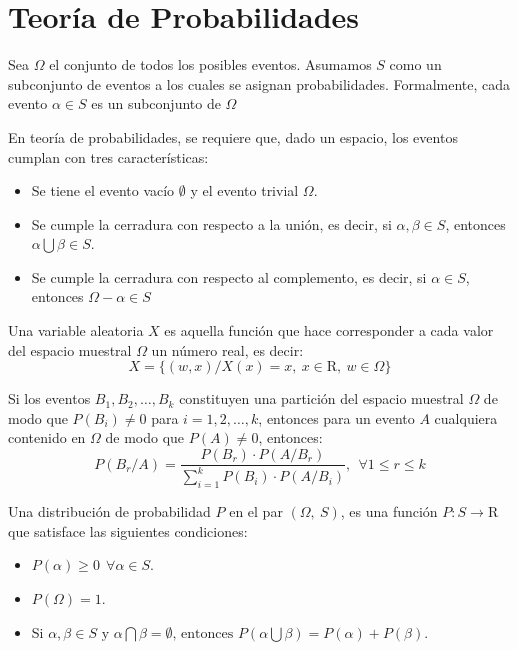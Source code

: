 \section{Teoría de Probabilidades}
\label{sec:teoria-probabilidades}
  \begin{defn} Sea $\Omega$ el conjunto de todos los 
  posibles eventos. Asumamos $S$ como un subconjunto de eventos a los cuales 
  se asignan probabilidades. Formalmente, cada evento $\alpha \in S$ es un 
  subconjunto de $\Omega$
  \end{defn}
 En teoría de probabilidades, se requiere que, dado un espacio, los eventos 
 cumplan con tres características:
  \begin{itemize}
    \item Se tiene el evento vacío $\emptyset$ y el evento trivial $\Omega$.
    \item Se cumple la cerradura con respecto a la unión, es decir, si 
    $\alpha, \beta \in S$, entonces $\alpha \bigcup \beta \in S$.
    \item Se cumple la cerradura con respecto al complemento, es decir, si 
    $\alpha \in S$, entonces $\Omega - \alpha \in S$
  \end{itemize}
  \begin{defn} Una variable aleatoria $X$ es aquella 
  función que hace corresponder a cada valor del espacio muestral $\Omega$ un 
  número real, es decir: 
  $$X = \lbrace (w, x) / X(x) = x, ~x \in \mathrm{R}, ~w \in \Omega \rbrace$$
	\end{defn}
  \begin{thm} Si los eventos $B_1, B_2, \dots, B_k$ 
  constituyen una partición del espacio muestral $\Omega$ de modo que 
  $P(B_i) \neq 0$ para $i = 1,2,\dots,k$, entonces para un evento $A$ 
  cualquiera contenido en $\Omega$ de modo que $P(A) \neq 0$, entonces: 
  $$P(B_r / A) = \dfrac{P(B_r) \cdot P(A / B_r)}{\displaystyle\sum_{i=1}^{k}{P(B_i) \cdot P(A / B_i)}}, ~~ \forall 1\leq r \leq k$$
  \label{thm:cap-marcoteorico:teorema-bayes}
	\end{thm}
  \begin{defn} Una distribución de probabilidad 
  $P$ en el par $(\Omega,~ S)$, es una función $P : S \rightarrow \mathrm{R}$
  que satisface las siguientes condiciones:
	  \begin{itemize}
	    \item $P(\alpha) \geq 0 ~~ \forall \alpha \in S$.
	    \item $P(\Omega) = 1$.
	    \item Si $\alpha, \beta \in S \text{ y } \alpha \bigcap \beta = \emptyset \text{, entonces } P(\alpha \bigcup \beta) = P(\alpha) + P(\beta)$.
	  \end{itemize}
  \end{defn}
